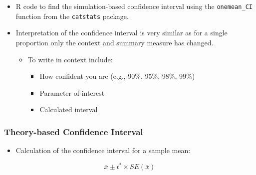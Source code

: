 \documentclass[
]{report}
\newenvironment{Shaded}{\begin{snugshade}}{\end{snugshade}}
\newcommand{\AttributeTok}[1]{\textcolor[rgb]{0.13,0.29,0.53}{#1}}
\newcommand{\CommentTok}[1]{\textcolor[rgb]{0.56,0.35,0.01}{\textit{#1}}}
\newcommand{\DecValTok}[1]{\textcolor[rgb]{0.00,0.00,0.81}{#1}}
\newcommand{\FunctionTok}[1]{\textcolor[rgb]{0.13,0.29,0.53}{\textbf{#1}}}
\newcommand{\NormalTok}[1]{#1}
\newcommand{\SpecialCharTok}[1]{\textcolor[rgb]{0.81,0.36,0.00}{\textbf{#1}}}
\newcommand{\StringTok}[1]{\textcolor[rgb]{0.31,0.60,0.02}{#1}}
\providecommand{\tightlist}{%
  \setlength{\itemsep}{0pt}\setlength{\parskip}{0pt}}
\begin{document}
\begin{itemize}
\item
  R code to find the simulation-based confidence interval using the \texttt{onemean\_CI} function from the \texttt{catstats} package.

\begin{Shaded}
\end{Shaded}
\item
  Interpretation of the confidence interval is very similar as for a single proportion only the context and summary measure has changed.

  \begin{itemize}
  \item
    To write in context include:

    \begin{itemize}
    \item
      How confident you are (e.g., 90\%, 95\%, 98\%, 99\%)
    \item
      Parameter of interest
    \item
      Calculated interval
    \end{itemize}
  \end{itemize}
\end{itemize}

\subsubsection*{Theory-based Confidence Interval}\label{theory-based-confidence-interval-1}

\begin{itemize}
\tightlist
\item
  Calculation of the confidence interval for a sample mean:
\end{itemize}

\[\bar{x}\pm t^*\times SE(\bar{x})\]
\end{document}
